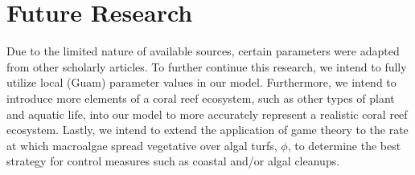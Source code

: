 \documentclass[12pt]{article}
\begin{document}
\section{Future Research}
Due to the limited nature of available sources, certain parameters were adapted from other scholarly articles. To further continue this research, we intend to fully utilize local (Guam) parameter values in our model. Furthermore, we intend to introduce more elements of a coral reef ecosystem, such as other types of plant and aquatic life, into our model to more accurately represent a realistic coral reef ecosystem. Lastly, we intend to extend the application of game theory to the rate at which macroalgae spread vegetative over algal turfs, $\phi$, to determine the best strategy for control measures such as coastal and/or algal cleanups. 
\end{document}
